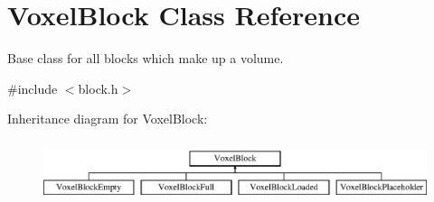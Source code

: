\hypertarget{classVoxelBlock}{
\section{\-Voxel\-Block \-Class \-Reference}
\label{d1/d83/classVoxelBlock}
}


\-Base class for all blocks which make up a volume.  




{\ttfamily \#include $<$block.\-h$>$}

\-Inheritance diagram for \-Voxel\-Block\-:\begin{figure}[H]
\begin{center}
\leavevmode
\includegraphics[height=1.854305cm]{d1/d83/classVoxelBlock}
\end{center}
\end{figure}
